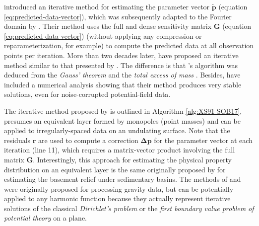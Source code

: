 \citet{xia-sprowl1991} introduced an iterative method for estimating the parameter vector $\tilde{\mathbf{p}}$ 
(equation \ref{eq:predicted-data-vector}), which was subsequently adapted to the Fourier domain by \citet{xia-etal1993}.
Their method uses the full and dense sensitivity matrix $\mathbf{G}$ (equation \ref{eq:predicted-data-vector})
(without applying any compression or reparameterization, for example) to compute the predicted data
at all observation points per iteration.
More than two decades later, \cite{siqueira-etal2017} have proposed an iterative method similar to that presented by \citet{xia-sprowl1991}.
The difference is that \citeauthor{siqueira-etal2017}'s algorithm was deduced from 
the \textit{Gauss' theorem} \cite[e.g.,][p. 43]{kellogg1967} and the \textit{total excess of mass} \cite[e.g.,][p. 60]{blakely1996}.
Besides, \citet{siqueira-etal2017} have included a numerical analysis showing that their method produces very stable solutions, 
even for noise-corrupted potential-field data.

The iterative method proposed by \citet{siqueira-etal2017} is outlined in Algorithm \ref{alg:XS91-SOB17},
presumes an equivalent layer formed by monopoles (point masses) and can be applied to
irregularly-spaced data on an undulating surface.
Note that the residuals $\mathbf{r}$ are used to compute a correction $\boldsymbol{\Delta}\mathbf{p}$
for the parameter vector at each iteration (line 11), which requires a matrix-vector product involving the 
full matrix $\mathbf{G}$.
Interestingly, this approach for estimating the physical property distribution on an equivalent layer 
is the same originally proposed by \citet{bott1960} for estimating the basement relief under sedimentary basins.
The methods of \citet{xia-sprowl1991} and \citet{siqueira-etal2017} were originally proposed for processing gravity data,
but can be potentially applied to any harmonic function because they actually represent iterative solutions of the 
classical \textit{Dirichlet’s problem} or the \textit{first boundary value problem of potential theory} 
\cite[][ p. 236]{kellogg1967} on a plane.

